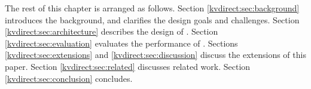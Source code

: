 The rest of this chapter is arranged as follows. Section \ref {kvdirect:sec:background} introduces the background, and clarifies the design goals and challenges.
Section \ref {kvdirect:sec:architecture} describes the design of \oursys{}.
Section \ref {kvdirect:sec:evaluation} evaluates the performance of \oursys{}.
Sections \ref {kvdirect:sec:extensions} and \ref {kvdirect:sec:discussion} discuss the extensions of this paper.
Section \ref {kvdirect:sec:related} discusses related work.
Section \ref {kvdirect:sec:conclusion} concludes.
